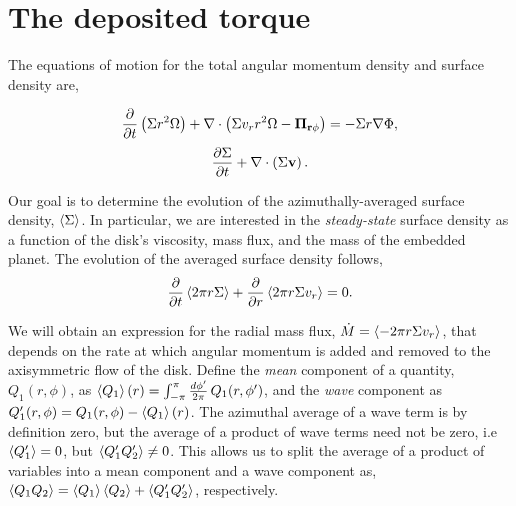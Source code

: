 \section{The deposited torque}

The equations of motion for the total angular momentum density and surface density are,

\begin{equation} \label{eq:tot_ang}
\pderiv{t} \left( \Sigma r^2 \Omega \right) + \div \left( \Sigma  v_r r^2 \Omega - \vec{\Pi_{r\phi}} \right) = - \Sigma r \del \Phi ,
\end{equation}
\begin{equation} \label{eq:tot_sigma}
\ppderiv{\Sigma}{t} + \div \left( \Sigma \vec{v} \right) .
\end{equation}

Our goal is to determine the evolution of the azimuthally-averaged surface density, $\left\langle \Sigma \right\rangle$. In particular, we are interested in the \emph{steady-state} surface density as a function of the disk's viscosity, mass flux, and the mass of the embedded planet. The evolution of the averaged surface density follows,
\begin{equation} \label{eq:avg_sigma}
\pderiv{t}\avg{2 \pi r \Sigma} + \pderiv{r} \avg{2 \pi r \Sigma v_r}  = 0 .
\end{equation}

We will obtain an expression for the radial mass flux, $\dot{M} = \left\langle -2 \pi r \Sigma v_r \right\rangle$, that depends on the rate at which angular momentum is added and removed to the axisymmetric flow of the disk. Define the \emph{mean} component of a quantity, $Q_1(r,\phi)$, as $\left\langle Q_1 \right\rangle(r) = \int_{-\pi}^{\pi} \frac{d\phi'}{2 \pi} \, Q_1(r,\phi')$, and the \emph{wave} component as $Q_1'(r,\phi) = Q_1(r,\phi) - \left\langle Q_1 \right\rangle(r)$. The azimuthal average of a wave term is by definition zero, but the average of a product of wave terms need not be zero, i.e $\left\langle  Q_1 ' \right\rangle = 0$, but $\left\langle  Q_1' Q_2' \right\rangle \neq 0$. This allows us to split the average of a product of variables into a mean component and a wave component as, $\left\langle Q_1 Q_2 \right\rangle = \left\langle Q_1 \right\rangle \left\langle Q_2 \right\rangle + \left\langle  Q_1' Q_2' \right\rangle$, respectively. 

